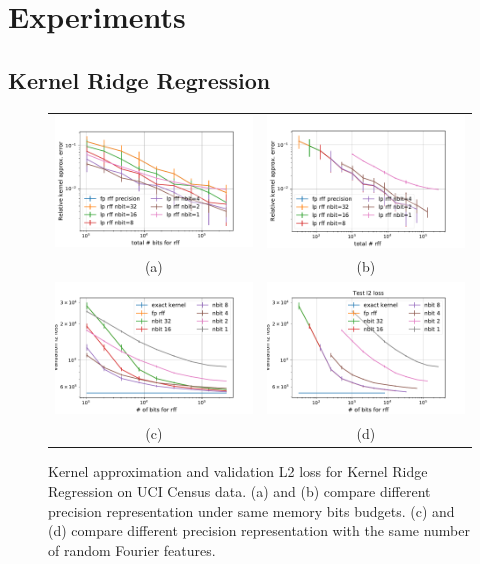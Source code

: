 \section{Experiments}
\label{sec:experiments}
\subsection{Kernel Ridge Regression}
\begin{figure}
\centering
\begin{tabular}{c c}
	\includegraphics[width=.45\linewidth]{figures/kernel_approx_error.pdf} &
	\includegraphics[width=.45\linewidth]{figures/kernel_approx_error_n_fp.pdf} \\
	(a) & (b) \\
	\includegraphics[width=.45\linewidth]{figures/valid_l2.pdf} &
	\includegraphics[width=.45\linewidth]{figures/valid_l2_n_fp.pdf}  \\
		(c) & (d) \\
\end{tabular}
\caption{Kernel approximation and validation L2 loss for Kernel Ridge Regression on UCI Census data. (a) and (b) compare different precision representation under same memory bits budgets. (c) and (d) compare different precision representation with the same number of random Fourier features.}
\label{fig:kernel_and_l2}
\end{figure}


